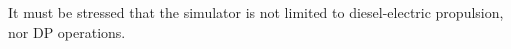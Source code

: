 \documentclass[journal]{IEEEtran}
\begin{document}
\begin{description}

\end{description} 

It must be stressed that the simulator is not limited to diesel-electric propulsion, nor DP operations.

\end{document}
